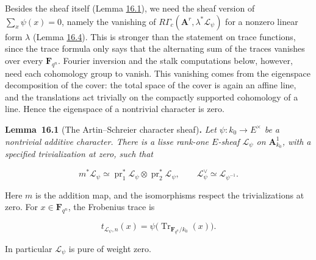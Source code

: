 \documentclass[11pt]{article}
\newenvironment{bpstatement}[2]{\par\addvspace{0.6\baselineskip}\noindent\textbf{#1}#2\textbf{.}\enspace\ignorespaces}
  {\par\addvspace{0.4\baselineskip}}
\newenvironment{bpstatementit}[2]{\begin{bpstatement}{#1}{#2}\itshape\ignorespaces}{\end{bpstatement}}
\begin{document}
Besides the sheaf itself (Lemma \hyperref[bp171]{16.1}), we need the sheaf version of \(\sum_x\psi(x)=0\), namely the vanishing of \(R\Gamma_c(\mathbf A^r,\lambda^*\mathcal L_\psi)\) for a nonzero linear form \(\lambda\) (Lemma \hyperref[bp179]{16.4}). This is stronger than the statement on trace functions, since the trace formula only says that the alternating sum of the traces vanishes over every \(\mathbf F_{q^n}\). Fourier inversion and the stalk computations below, however, need each cohomology group to vanish. This vanishing comes from the eigenspace decomposition of the cover: the total space of the cover is again an affine line, and the translations act trivially on the compactly supported cohomology of a line. Hence the eigenspace of a nontrivial character is zero.

\label{bp171}%
\begin{bpstatementit}{Lemma~16.1}{ (The Artin–Schreier character sheaf)}
Let \(\psi:k_0\to E^\times\) be a nontrivial additive character. There is a lisse rank-one \(E\)-sheaf \(\mathcal L_\psi\) on \(\mathbf A^1_{k_0}\), with a specified trivialization at zero, such that

\[
m^*\mathcal L_\psi\simeq
\operatorname{pr}_1^*\mathcal L_\psi\otimes
\operatorname{pr}_2^*\mathcal L_\psi,
\qquad
\mathcal L_\psi^\vee\simeq\mathcal L_{\psi^{-1}}.
\]

Here \(m\) is the addition map, and the isomorphisms respect the trivializations at zero. For \(x\in\mathbf F_{q^n}\), the Frobenius trace is

\[
t_{\mathcal L_\psi,n}(x)
=\psi\bigl(\operatorname{Tr}_{\mathbf F_{q^n}/k_0}(x)\bigr).
\]

In particular \(\mathcal L_\psi\) is pure of weight zero.
\end{bpstatementit}
\end{document}
